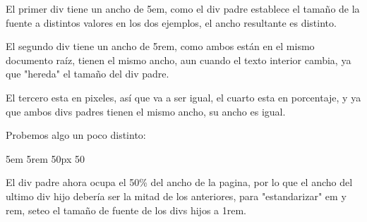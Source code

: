 \documentclass[letterpaper,10pt,spanish]{sphinxmanual}
\begin{document}
El primer div tiene un ancho de 5em, como el div padre establece el tamaño de
la fuente a distintos valores en los dos ejemplos, el ancho resultante es
distinto.

El segundo div tiene un ancho de 5rem, como ambos están en el mismo documento
raíz, tienen el mismo ancho, aun cuando el texto interior cambia, ya que
"hereda" el tamaño del div padre.

El tercero esta en pixeles, así que va a ser igual, el cuarto esta en
porcentaje, y ya que ambos divs padres tienen el mismo ancho, su ancho es
igual.

Probemos algo un poco distinto:

%
\begin{sphinxVerbatim}[commandchars=\\\{\}]
 
     5em
     5rem
     50px
     50\PYGZpc{}
\end{sphinxVerbatim}



El div padre ahora ocupa el 50\% del ancho de la pagina, por lo que el ancho del
ultimo div hijo debería ser la mitad de los anteriores, para "estandarizar" em
y rem, seteo el tamaño de fuente de los divs hijos a 1rem.
\end{document}

